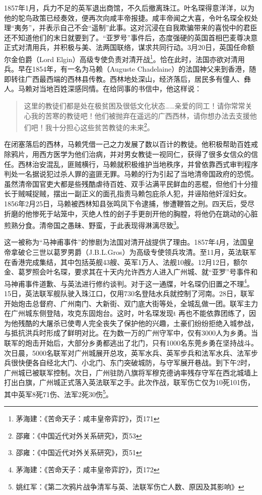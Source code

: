 1857年1月，兵力不足的英军退出商馆，不久后撤离珠江。叶名琛得意洋洋，以为他的鸵鸟政策已经奏效，便再次向咸丰帝报捷。咸丰帝闻之大喜，令叶名琛全权处理“夷务”，并表示自己不会“遥制”此事。这对沉浸在自我欺骗带来的喜悦中的君臣还不知道他们的末日就要到了。“亚罗号”事件后，态度强硬的英国首相巴麦尊决意正式对清用兵，并积极与美、法两国联络，谋求共同行动。3月20日，英国任命额尔金伯爵（Lord Elgin）高级专使负责对清开战\footnote{茅海建：《苦命天子：咸丰皇帝弈詝》，页171}。恰在此时，法国亦欲对清用兵。早在1854年，有一名为马赖（Auguste Chadelaine）的法国神父来到香港，随即转往广西最西端的西林县传教。西林地处深山，经济落后，居民多有僮人、彝人。马赖对当地百姓深感同情。在给同事的书信中，他这样说：

\begin{quote}
这里的教徒们都是处在极贫困及很低文化状态……亲爱的同工！请你常常关心我的苦寒的教徒吧！他们被抛弃在遥远的广西西林，请你想办法去支援他们吧！我十分担心这些贫苦教徒的未来\footnote{邵雍：《中国近代对外关系研究》，页53}。
\end{quote}

在闭塞落后的西林，马赖凭借一己之力发展了数以百计的教徒。他积极帮助百姓戒除鸦片，用西方医学为他们治病，并对男女教徒一视同仁，获得了很多女信众的信任。西林治安混乱，匪贼横行，马赖就积极维护当地秩序，并曾依靠西式审判程序判处一名据说犯过杀人罪的盗匪无罪。马赖的行为引起了当地清帝国政府的恐慌。虽然清帝国官吏大都是些残酷虐待百姓、双手沾满平民鲜血的恶棍，但他们十分擅长于贼喊捉贼，摆出一副正义的面孔指责马赖包庇杀人犯，并诬陷他奸淫妇女。1856年2月25日，马赖被西林知县张鸣凤下令逮捕，惨遭鞭笞之刑。四天后，受尽折磨的他惨死于站笼中，灭绝人性的刽子手更剖开他的胸膛，将他仍在跳动的心脏煎熟分食。清帝国之愚昧、野蛮，于此表现得淋漓尽致\footnote{邵雍：《中国近代对外关系研究》，页51}。

这一被称为“马神甫事件”的惨剧为法国对清开战提供了理由。1857年4月，法国皇帝拿破仑三世以葛罗男爵（J.B.L.Gros）为高级专使领兵攻清。至11月，英法联军在香港完成集结，其中包括英舰43艘、英军1万人、法舰10艘。12月12日，额尔金、葛罗照会叶名琛，要求其在十天内允许西方人进入广州城、就“亚罗”号事件和马神甫事件道歉、与英法进行修约谈判。对于这一通牒，叶名琛仍旧置之不理\footnote{茅海建：《苦命天子：咸丰皇帝弈詝》，页172}。15日，英法联军舰队驶入珠江口，仅用730名登陆水兵就控制了河南。28日，联军开始炮击总督府、广州南门、大新街、双门底大街等处，全城乱做一团。联军主力在广州城东侧登陆，攻克东固炮台。这时，叶名琛发现t 再也不能依靠团练了，因为他残酷的大屠杀已使粤人完全丧失了保护他的兴趣，土豪们纷纷拒绝入城参战，与抵抗洪兵时形成了鲜明对比。在为数一万的广州守军中，仅有3000人为乡勇。当联军的炮击开始后，大部分乡勇都逃出了北门，只有1000名东莞乡勇在坚持战斗。次日晨，5000名联军对广州城展开总攻，英军水兵、英军步兵和法军水兵、法军步兵很快便各自经北大门、小北门、东门突破城防，与守军展开巷战。到下午2时，广州城已被联军控制。次日，广州驻防八旗将军穆克德讷率残存守军在西北城墙上打出白旗，广州城正式落入英法联军之手。此次作战，联军伤亡仅为10死101伤，其中英军8死71伤、法军2死30伤\footnote{姚红军：《第二次鸦片战争清军与英、法联军伤亡人数、原因及其影响》}。

